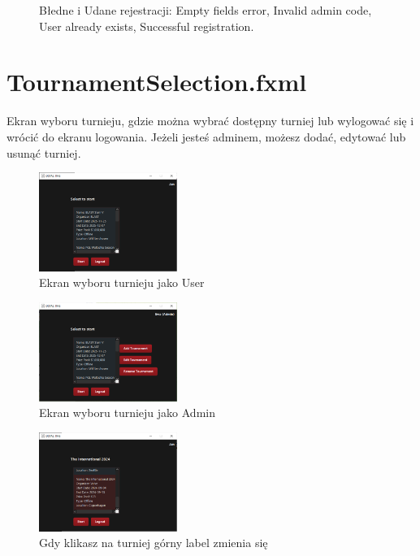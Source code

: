 \begin{figure}[H]
\begin{subfigure}{0.5\textwidth}
        \subcaption{\label{subfigure_d}}
    \end{subfigure}
    \caption{ Błedne i Udane rejestracji: \protect{} Empty fields error, \protect{} Invalid admin code, \protect{} User already exists, \protect{} Successful registration. \label{fig:subcaption}}
\end{figure}

\section{TournamentSelection.fxml}
Ekran wyboru turnieju, gdzie można wybrać dostępny turniej lub wylogować się i wrócić do ekranu logowania. Jeżeli jesteś adminem, możesz dodać, edytować lub usunąć turniej.\begin{figure}[H]
    \centering
    \includegraphics[width=0.4\textwidth]{figures/UserInterface.png}
    \caption{Ekran wyboru turnieju jako User \label{fig:tournament_selection}}
\end{figure}
\begin{figure}[H]
    \centering
    \includegraphics[width=0.4\textwidth]{figures/AdminInterface.png}
    \caption{Ekran wyboru turnieju jako Admin \label{fig:tournament_selection_admin}}
\end{figure}
\begin{figure}
    \centering
    \includegraphics[width=0.4\textwidth]{figures/Chosen.png}
    \caption{Gdy klikasz na turniej górny label zmienia się \label{fig:tournament_selection_fxml}}
\end{figure}
